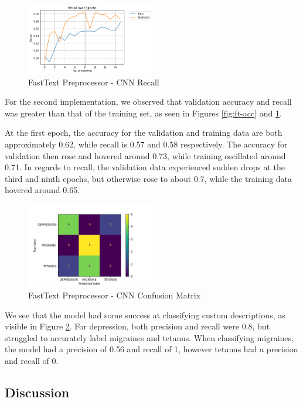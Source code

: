 \documentclass[12pt]{report}
\begin{document}
\begin{figure}[H]
	\centering
	\includegraphics[width=0.5\textwidth]{recall-1.png}
	\caption{FastText Preprocessor - CNN Recall}
	\label{fig:ft-rec}
\end{figure}

For the second implementation, we observed that validation accuracy and
recall was greater than that of the training set, as seen in Figures \ref{fig:ft-acc} and
\ref{fig:ft-rec}.

At the first epoch, the accuracy for the validation and training data are both
approximately 0.62, while recall is 0.57 and 0.58 respectively. The accuracy
for validation then rose and hovered around 0.73, while training oscillated
around 0.71. In regards to recall, the validation data experienced sudden drops
at the third and ninth epochs, but otherwise rose to about 0.7, while the
training data hovered around 0.65.

\begin{figure}[H]
	\centering
	\includegraphics[width=0.5\textwidth]{confusion_matrix_ft.png}
	\caption{FastText Preprocessor - CNN Confusion Matrix}
	\label{fig:ft-con}
\end{figure}

We see that the model had some success at classifying custom descriptions, as visible in
Figure \ref{fig:ft-con}.
For depression, both precision and recall were 0.8, but struggled to accurately
label migraines and tetanus. When classifying migraines, the model had a
precision of 0.56 and recall of 1, however tetanus had a precision and recall of
0.

\subsection{Discussion}
\end{document}
